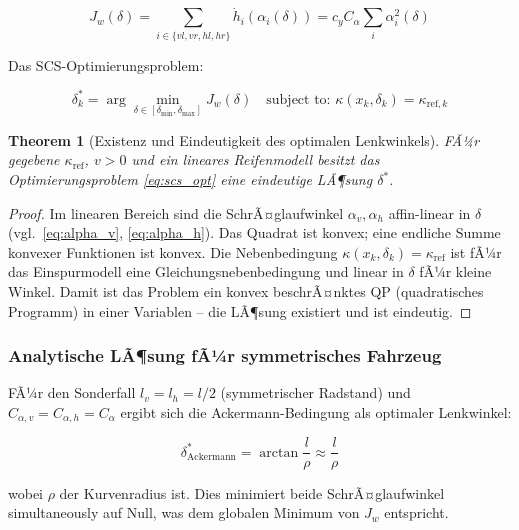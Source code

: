 ﻿\documentclass[12pt,a4paper]{article}
\newtheorem{theorem}{Theorem}[section]
\theoremstyle{definition}
\theoremstyle{remark}
\begin{document}
\begin{equation}
  J_w(\delta) = \sum_{i \in \{vl, vr, hl, hr\}} \dot{h}_i(\alpha_i(\delta))
  = c_y C_\alpha \sum_{i} \alpha_i^2(\delta)
  \label{eq:wear_total}
\end{equation}

Das SCS-Optimierungsproblem:

\begin{equation}
  \delta^*_k = \arg\min_{\delta \in [\delta_{\min}, \delta_{\max}]}
    J_w(\delta) \quad \text{subject to: } \kappa(x_k, \delta_k) = \kappa_{\mathrm{ref},k}
  \label{eq:scs_opt}
\end{equation}

\begin{theorem}[Existenz und Eindeutigkeit des optimalen Lenkwinkels]
\label{thm:scs_unique}
FÃ¼r gegebene $\kappa_{\mathrm{ref}}$, $v > 0$ und ein lineares Reifenmodell besitzt
das Optimierungsproblem \eqref{eq:scs_opt} eine eindeutige LÃ¶sung $\delta^*$.
\end{theorem}

\begin{proof}
Im linearen Bereich sind die SchrÃ¤glaufwinkel $\alpha_v, \alpha_h$ affin-linear
in $\delta$ (vgl.\ \eqref{eq:alpha_v}, \eqref{eq:alpha_h}). Das Quadrat ist konvex;
eine endliche Summe konvexer Funktionen ist konvex. Die Nebenbedingung
$\kappa(x_k, \delta_k) = \kappa_{\mathrm{ref}}$ ist fÃ¼r das Einspurmodell eine
Gleichungsnebenbedingung und linear in $\delta$ fÃ¼r kleine Winkel. Damit ist
das Problem ein konvex beschrÃ¤nktes QP (quadratisches Programm) in einer
Variablen -- die LÃ¶sung existiert und ist eindeutig.
\end{proof}

\subsubsection{Analytische LÃ¶sung fÃ¼r symmetrisches Fahrzeug}

FÃ¼r den Sonderfall $l_v = l_h = l/2$ (symmetrischer Radstand) und
$C_{\alpha,v} = C_{\alpha,h} = C_\alpha$ ergibt sich die Ackermann-Bedingung
als optimaler Lenkwinkel:

\begin{equation}
  \delta^*_{\mathrm{Ackermann}} = \arctan\!\frac{l}{\rho}
  \approx \frac{l}{\rho}
  \label{eq:ackermann}
\end{equation}

wobei $\rho$ der Kurvenradius ist. Dies minimiert beide SchrÃ¤glaufwinkel
simultaneously auf Null, was dem globalen Minimum von $J_w$ entspricht.
\end{document}

